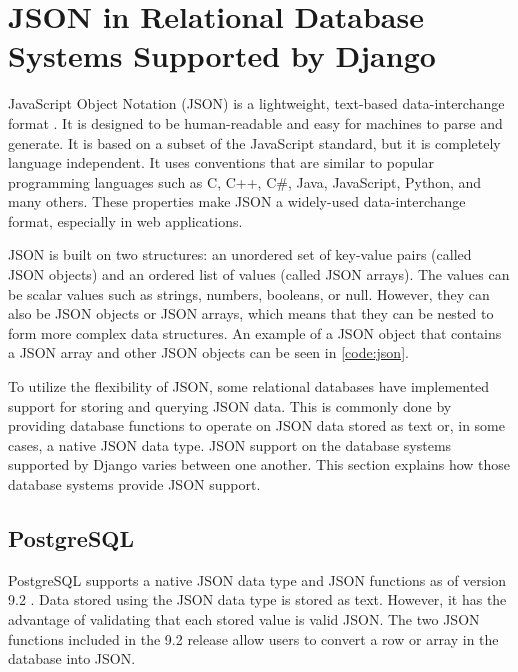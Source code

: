 \section{JSON in Relational Database Systems Supported by Django}

JavaScript Object Notation (JSON) is a lightweight, text-based data-interchange
format \cite{json}. It is designed to be human-readable and easy for machines
to parse and generate. It is based on a subset of the JavaScript standard, but
it is completely language independent. It uses conventions that are similar to
popular programming languages such as C, C++, C\#, Java, JavaScript, Python,
and many others. These properties make JSON a widely-used data-interchange
format, especially in web applications.

JSON is built on two structures: an unordered set of key-value pairs (called
JSON objects) and an ordered list of values (called JSON arrays). The values
can be scalar values such as strings, numbers, booleans, or null. However, they
can also be JSON objects or JSON arrays, which means that they can be nested
to form more complex data structures. An example of a JSON object that contains
a JSON array and other JSON objects can be seen in \autoref{code:json}.



To utilize the flexibility of JSON, some relational databases have implemented
support for storing and querying JSON data. This is commonly done by providing
database functions to operate on JSON data stored as text or, in some cases, a
native JSON data type. JSON support on the database systems supported by Django
varies between one another. This section explains how those database systems
provide JSON support.

\subsection{PostgreSQL}

PostgreSQL supports a native JSON data type and JSON functions as of version
9.2 \cite{postgresql:9.2}. Data stored using the JSON data type is stored as
text. However, it has the advantage of validating that each stored value is
valid JSON. The two JSON functions included in the 9.2 release allow users to
convert a row or array in the database into JSON.

